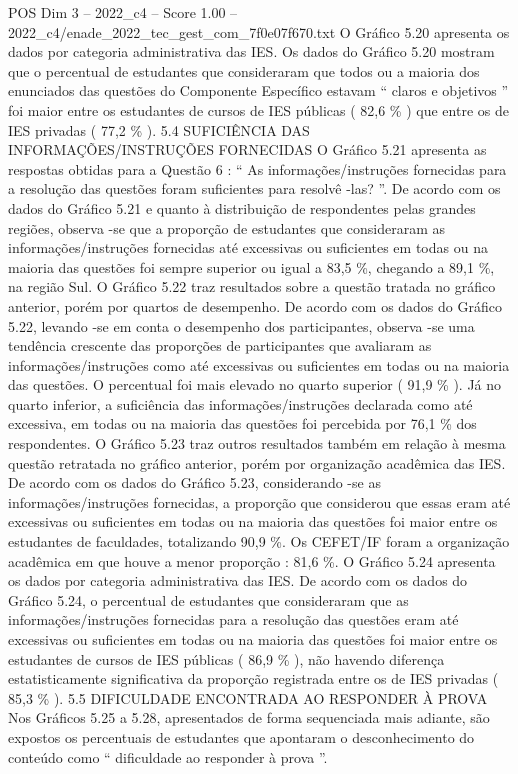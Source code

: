 \begin{textsample}{POS Dim 3 – 2022\_c4 – Score 1.00 – 2022\_c4/enade\_2022\_tec\_gest\_com\_7f0e07f670.txt}
O Gráfico 5.20 apresenta os dados por categoria administrativa das IES.
Os dados do Gráfico 5.20 mostram que o percentual de estudantes que consideraram que todos ou a maioria dos enunciados das questões do Componente Específico estavam “ claros e objetivos ” foi maior entre os estudantes de cursos de IES públicas ( 82,6 \% ) que entre os de IES privadas ( 77,2 \% ). 5.4 SUFICIÊNCIA DAS INFORMAÇÕES/INSTRUÇÕES FORNECIDAS O Gráfico 5.21 apresenta as respostas obtidas para a Questão 6 : “ As informações/instruções fornecidas para a resolução das questões foram suficientes para resolvê -las? ”.
De acordo com os dados do Gráfico 5.21 e quanto à distribuição de respondentes pelas grandes regiões, observa -se que a proporção de estudantes que consideraram as informações/instruções fornecidas até excessivas ou suficientes em todas ou na maioria das questões foi sempre superior ou igual a 83,5 \%, chegando a 89,1 \%, na região Sul.
O Gráfico 5.22 traz resultados sobre a questão tratada no gráfico anterior, porém por quartos de desempenho.
De acordo com os dados do Gráfico 5.22, levando -se em conta o desempenho dos participantes, observa -se uma tendência crescente das proporções de participantes que avaliaram as informações/instruções como até excessivas ou suficientes em todas ou na maioria das questões.
O percentual foi mais elevado no quarto superior ( 91,9 \% ).
Já no quarto inferior, a suficiência das informações/instruções declarada como até excessiva, em todas ou na maioria das questões foi percebida por 76,1 \% dos respondentes.
O Gráfico 5.23 traz outros resultados também em relação à mesma questão retratada no gráfico anterior, porém por organização acadêmica das IES.
De acordo com os dados do Gráfico 5.23, considerando -se as informações/instruções fornecidas, a proporção que considerou que essas eram até excessivas ou suficientes em todas ou na maioria das questões foi maior entre os estudantes de faculdades, totalizando 90,9 \%.
Os CEFET/IF foram a organização acadêmica em que houve a menor proporção : 81,6 \%.
O Gráfico 5.24 apresenta os dados por categoria administrativa das IES.
De acordo com os dados do Gráfico 5.24, o percentual de estudantes que consideraram que as informações/instruções fornecidas para a resolução das questões eram até excessivas ou suficientes em todas ou na maioria das questões foi maior entre os estudantes de cursos de IES públicas ( 86,9 \% ), não havendo diferença estatisticamente significativa da proporção registrada entre os de IES privadas ( 85,3 \% ). 5.5 DIFICULDADE ENCONTRADA AO RESPONDER À PROVA Nos Gráficos 5.25 a 5.28, apresentados de forma sequenciada mais adiante, são expostos os percentuais de estudantes que apontaram o desconhecimento do conteúdo como “ dificuldade ao responder à prova ”.

\end{textsample}
